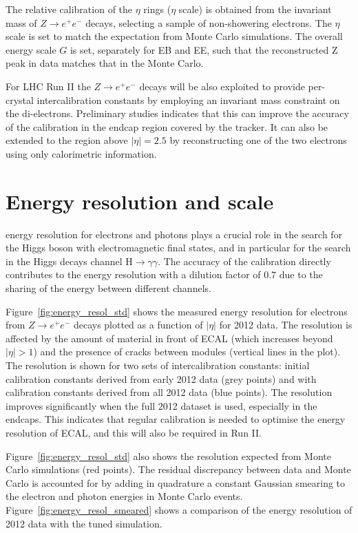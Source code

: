 \documentclass[journal]{IEEEtran}
\begin{document}
The relative calibration of the $\eta$ rings ($\eta$ scale) is obtained from the invariant mass of $Z\to e^+e^-$ decays, selecting a sample of non-showering electrons. The $\eta$ scale is set to match the expectation from Monte Carlo simulations. The overall energy scale $G$ is set, separately for EB and EE, such that the reconstructed Z peak in data matches that in the Monte Carlo.

For LHC Run II the $Z\to e^+e^-$ decays will be also exploited to provide per-crystal intercalibration constants by employing an invariant mass constraint on the di-electrons. Preliminary studies indicates that this can improve the accuracy of the calibration in the endcap region covered by the tracker. It can also be extended to the region above $\vert\eta\vert=2.5$ by reconstructing one of the two electrons using only calorimetric information. 



\section{Energy resolution and scale}
 energy resolution for electrons and photons plays a crucial role in the search for the Higgs boson with electromagnetic final states, and in particular for the search in the Higgs decays channel H$\to\gamma\gamma$. The accuracy of the calibration directly contributes to the energy resolution with a dilution factor of 0.7 due to the sharing of the energy between different channels. 

Figure~\ref{fig:energy_resol_std} shows the measured energy resolution for electrons from $Z\to e^+e^-$ decays plotted as a function of $\vert\eta\vert$ for 2012 data. The resolution is affected by the amount of material in front of ECAL (which increases beyond $\vert\eta\vert>1$) and the presence of cracks between modules (vertical lines in the plot). The resolution is shown for two sets of intercalibration constants: initial calibration constants derived from early 2012 data (grey points) and with calibration constants derived from all 2012 data (blue points). The resolution improves significantly when the full 2012 dataset is used, especially in the endcaps. This indicates that regular calibration is needed to optimise the energy resolution of ECAL, and this will also be required in Run II.

Figure~\ref{fig:energy_resol_std} also shows the resolution expected from Monte Carlo simulations (red points). The residual discrepancy between data and Monte Carlo is accounted for by adding in quadrature a constant Gaussian smearing to the electron and photon energies in Monte Carlo events. Figure~\ref{fig:energy_resol_smeared} shows a comparison of the energy resolution of 2012 data with the tuned simulation.
\end{document}

